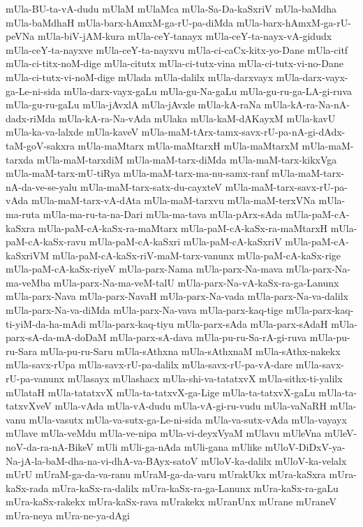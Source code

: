 {mUla-BU-ta-vA-dudu
mUlaM
mUlaMca
mUla-Sa-Da-kaSxriV
mUla-baMdha
mUla-baMdhaH
mUla-barx-hAmxM-ga-rU-pa-diMda
mUla-barx-hAmxM-ga-rU-peVNa
mUla-biV-jAM-kura
mUla-ceY-tanayx
mUla-ceY-ta-nayx-vA-gidudx
mUla-ceY-ta-nayxve
mUla-ceY-ta-nayxvu
mUla-ci-caCx-kitx-yo-Dane
mUla-citf
mUla-ci-titx-noM-dige
mUla-citutx
mUla-ci-tutx-vina
mUla-ci-tutx-vi-no-Dane
mUla-ci-tutx-vi-noM-dige
mUlada
mUla-dalilx
mUla-darxvayx
mUla-darx-vayx-ga-Le-ni-sida
mUla-darx-vayx-gaLu
mUla-gu-Na-gaLu
mUla-gu-ru-ga-LA-gi-ruva
mUla-gu-ru-gaLu
mUla-jAvxlA
mUla-jAvxle
mUla-kA-raNa
mUla-kA-ra-Na-nA-dadx-riMda
mUla-kA-ra-Na-vAda
mUlaka
mUla-kaM-dAKayxM
mUla-kavU
mUla-ka-va-lalxde
mUla-kaveV
mUla-maM-tArx-tamx-savx-rU-pa-nA-gi-dAdx-taM-goV-sakxra
mUla-maMtarx
mUla-maMtarxH
mUla-maMtarxM
mUla-maM-tarxda
mUla-maM-tarxdiM
mUla-maM-tarx-diMda
mUla-maM-tarx-kikxVga
mUla-maM-tarx-mU-tiRya
mUla-maM-tarx-ma-nu-samx-ranf
mUla-maM-tarx-nA-da-ve-se-yalu
mUla-maM-tarx-satx-du-cayxteV
mUla-maM-tarx-savx-rU-pa-vAda
mUla-maM-tarx-vA-dAta
mUla-maM-tarxvu
mUla-maM-terxVNa
mUla-ma-ruta
mUla-ma-ru-ta-na-Dari
mUla-ma-tava
mUla-pArx-sAda
mUla-paM-cA-kaSxra
mUla-paM-cA-kaSx-ra-maMtarx
mUla-paM-cA-kaSx-ra-maMtarxH
mUla-paM-cA-kaSx-ravu
mUla-paM-cA-kaSxri
mUla-paM-cA-kaSxriV
mUla-paM-cA-kaSxriVM
mUla-paM-cA-kaSx-riV-maM-tarx-vanunx
mUla-paM-cA-kaSx-rige
mUla-paM-cA-kaSx-riyeV
mUla-parx-Nama
mUla-parx-Na-mava
mUla-parx-Na-ma-veMba
mUla-parx-Na-ma-veM-talU
mUla-parx-Na-vA-kaSx-ra-ga-Lanunx
mUla-parx-Nava
mUla-parx-NavaH
mUla-parx-Na-vada
mUla-parx-Na-va-dalilx
mUla-parx-Na-va-diMda
mUla-parx-Na-vava
mUla-parx-kaq-tige
mUla-parx-kaq-ti-yiM-da-ha-mAdi
mUla-parx-kaq-tiyu
mUla-parx-sAda
mUla-parx-sAdaH
mUla-parx-sA-da-mA-doDaM
mUla-parx-sA-dava
mUla-pu-ru-Sa-rA-gi-ruva
mUla-pu-ru-Sara
mUla-pu-ru-Saru
mUla-sAthxna
mUla-sAthxnaM
mUla-sAthx-nakekx
mUla-savx-rUpa
mUla-savx-rU-pa-dalilx
mUla-savx-rU-pa-vA-dare
mUla-savx-rU-pa-vanunx
mUlasayx
mUlashacx
mUla-shi-va-tatatxvX
mUla-sithx-ti-yalilx
mUlataH
mUla-tatatxvX
mUla-ta-tatxvX-ga-Lige
mUla-ta-tatxvX-gaLu
mUla-ta-tatxvXveV
mUla-vAda
mUla-vA-dudu
mUla-vA-gi-ru-vudu
mUla-vaNaRH
mUla-vanu
mUla-vasutx
mUla-va-sutx-ga-Le-ni-sida
mUla-va-sutx-vAda
mUla-vayayx
mUlave
mUla-veMdu
mUla-ve-nipa
mUla-vi-deyxVyaM
mUlavu
mUleVna
mUleV-noV-da-ra-nA-BikeV
mUli
mUli-ga-nAda
mUli-gana
mUlike
mUloV-DiDxV-ya-Na-jA-la-baM-dha-na-vi-dhA-va-BAyx-satoV
mUloV-ka-dalilx
mUloV-ka-velalx
mUrU
mUraM-ga-da-va-ranu
mUraM-ga-da-varu
mUrakUkx
mUra-kaSxra
mUra-kaSx-rada
mUra-kaSx-ra-dalilx
mUra-kaSx-ra-ga-Lanunx
mUra-kaSx-ra-gaLu
mUra-kaSx-rakekx
mUra-kaSx-rava
mUrakekx
mUranUnx
mUrane
mUraneV
mUra-neya
mUra-ne-ya-dAgi
}
